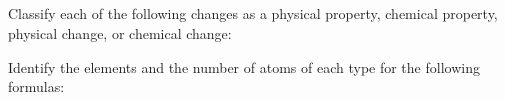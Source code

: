 \documentclass[addpoints, 12pt]{exam}
\begin{document}
\begin{questions}
\section{}

\question[8]
Classify each of the following changes as a physical property,
chemical property, physical change, or chemical change:


\question[8] Identify the elements and the number of atoms of each type for
  the following formulas:
\end{questions}
\end{document}
